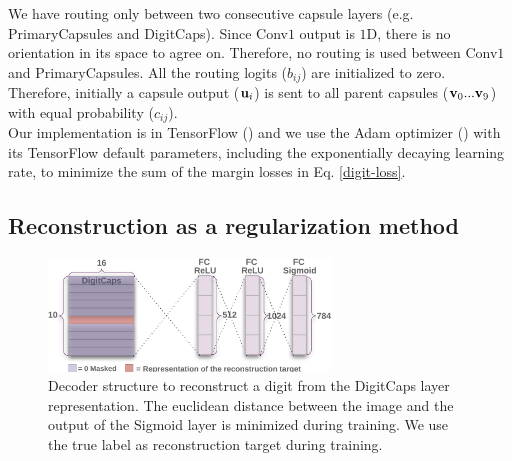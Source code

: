 \documentclass{article}
\begin{document}
We have routing only between two consecutive capsule layers (e.g. PrimaryCapsules and DigitCaps). Since Conv$1$ output is $1$D, there is no orientation in its space to agree on. Therefore, no routing is used between Conv$1$ and PrimaryCapsules. All the routing logits ($b_{ij}$) are initialized to zero. Therefore, initially a capsule output (${\bf u}_i$) is sent to all parent capsules (${\bf v}_0...{\bf v}_{9}$) with equal probability ($c_{ij}$).\\
Our implementation is in TensorFlow (\cite{abadi2016tensorflow}) and we use the Adam optimizer (\cite{kingma2014adam}) with its TensorFlow default parameters, including the exponentially decaying learning rate, to minimize the sum of the margin losses in Eq.  \ref{digit-loss}. 
\subsection{Reconstruction as a regularization method}
\begin{figure}[t]
  \caption{Decoder structure to reconstruct a digit from the DigitCaps layer representation. The euclidean distance between the image and the output of the Sigmoid layer is minimized during training. We use the true label as reconstruction target during training.}
  \label{reconsArch}
  \centering
    \includegraphics[height=3cm]{reconsArch}
\end{figure}
\end{document}
